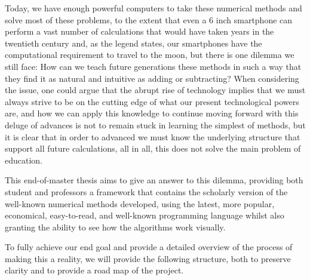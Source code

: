 Today, we have enough powerful computers to take these numerical methods and solve most of these problems, to the extent that even a 6 inch smartphone can perform a vast number of calculations that would have taken years in the twentieth century and, as the legend states, our smartphones have the computational requirement to travel to the moon, but there is one dilemma we still face: How can we teach future generations these methods in such a way that they find it as natural and intuitive as adding or subtracting? When considering the issue, one could argue that the abrupt rise of technology implies that we must always strive to be on the cutting edge of what our present technological powers are, and how we can apply this knowledge to continue moving forward with this deluge of advances is not to remain stuck in learning the simplest of methods, but it is clear that in order to advanced we must know the underlying structure that support all future calculations, all in all, this does not solve the main problem of education.


This end-of-master thesis aims to give an answer to this dilemma, providing both student and professors a framework that contains the scholarly version of the well-known numerical methods developed, using the latest, more popular, economical, easy-to-read, and well-known programming language whilst also granting the ability to see how the algorithms work visually.  

To fully achieve our end goal and provide a detailed overview of the process of making this a reality, we will provide the following structure, both to preserve clarity and to provide a road map of the project. 

